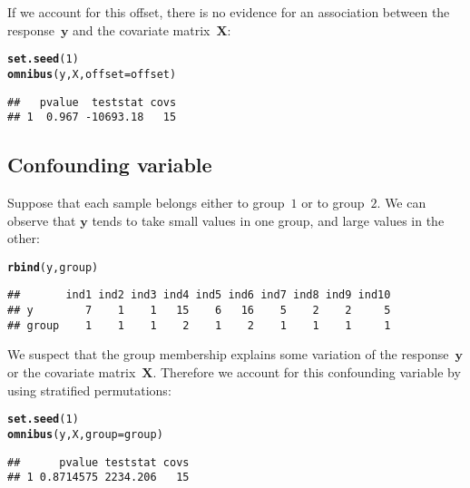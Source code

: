 \documentclass{article}\usepackage[]{graphicx}\usepackage[]{color}
\makeatletter
\newcommand{\hlnum}[1]{\textcolor[rgb]{0.686,0.059,0.569}{#1}}%
\newcommand{\hlstd}[1]{\textcolor[rgb]{0.345,0.345,0.345}{#1}}%
\newcommand{\hlkwc}[1]{\textcolor[rgb]{0.333,0.667,0.333}{#1}}%
\newcommand{\hlkwd}[1]{\textcolor[rgb]{0.737,0.353,0.396}{\textbf{#1}}}%
\newenvironment{kframe}{%
 \def\at@end@of@kframe{}%
 \ifinner\ifhmode%
  \def\at@end@of@kframe{\end{minipage}}%
  \begin{minipage}{\columnwidth}%
 \fi\fi%
 \def\FrameCommand##1{\hskip\@totalleftmargin \hskip-\fboxsep
 \colorbox{shadecolor}{##1}\hskip-\fboxsep
     \hskip-\linewidth \hskip-\@totalleftmargin \hskip\columnwidth}%
 \MakeFramed {\advance\hsize-\width
   \@totalleftmargin\z@ \linewidth\hsize
   \@setminipage}}%
 {\par\unskip\endMakeFramed%
 \at@end@of@kframe}
\newenvironment{knitrout}{}{} %
\makeatother
\begin{document}
If we account for this offset, there is no evidence for an association between the response~$\boldsymbol{y}$ and the covariate matrix~$\boldsymbol{X}$:
\begin{knitrout}
\color{fgcolor}\begin{kframe}
\begin{alltt}
\hlkwd{set.seed}\hlstd{(}\hlnum{1}\hlstd{)}
\hlkwd{omnibus}\hlstd{(y,X,}\hlkwc{offset}\hlstd{=offset)}
\end{alltt}
\begin{verbatim}
##   pvalue  teststat covs
## 1  0.967 -10693.18   15
\end{verbatim}
\end{kframe}
\end{knitrout}

\subsection{Confounding variable}
\label{TOA Confounding variable}

Suppose that each sample belongs either to group~$1$ or to group~$2$. We can observe that $\boldsymbol{y}$ tends to take small values in one group, and large values in the other:
\begin{knitrout}
\color{fgcolor}\begin{kframe}
\begin{alltt}
\hlkwd{rbind}\hlstd{(y,group)}
\end{alltt}
\begin{verbatim}
##       ind1 ind2 ind3 ind4 ind5 ind6 ind7 ind8 ind9 ind10
## y        7    1    1   15    6   16    5    2    2     5
## group    1    1    1    2    1    2    1    1    1     1
\end{verbatim}
\end{kframe}
\end{knitrout}

We suspect that the group membership explains some variation of the response~$\boldsymbol{y}$ or the covariate matrix~$\boldsymbol{X}$. Therefore we account for this confounding variable by using stratified permutations:
\begin{knitrout}
\color{fgcolor}\begin{kframe}
\begin{alltt}
\hlkwd{set.seed}\hlstd{(}\hlnum{1}\hlstd{)}
\hlkwd{omnibus}\hlstd{(y,X,}\hlkwc{group}\hlstd{=group)}
\end{alltt}
\begin{verbatim}
##      pvalue teststat covs
## 1 0.8714575 2234.206   15
\end{verbatim}
\end{kframe}
\end{knitrout}
\end{document}
